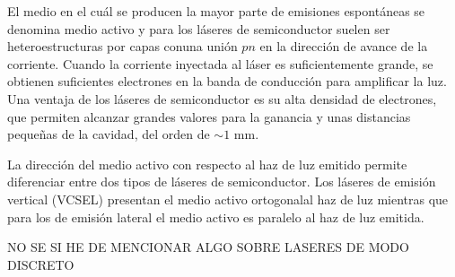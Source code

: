 El medio en el cu\'al se producen la mayor parte de emisiones espont\'aneas se denomina medio activo y para los l\'aseres de semiconductor suelen ser heteroestructuras por capas conuna uni\'on $pn$ en la direcci\'on de avance de la corriente. Cuando la corriente inyectada al l\'aser es suficientemente grande, se obtienen suficientes electrones en la banda de conducci\'on para amplificar la luz. Una ventaja de los l\'aseres de semiconductor es su alta densidad de electrones, que permiten alcanzar grandes valores para la ganancia y unas distancias pequeñas de la cavidad, del orden de $\sim 1$ mm.

La direcci\'on del medio activo con respecto al haz de luz emitido permite diferenciar entre dos tipos de l\'aseres de semiconductor. Los l\'aseres de emisi\'on vertical (VCSEL) presentan el medio activo ortogonalal haz de luz mientras que para los de emisión lateral el medio activo es paralelo al haz de luz emitida. 

NO SE SI HE DE MENCIONAR ALGO SOBRE LASERES DE MODO DISCRETO
